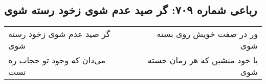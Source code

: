 \begin{center}
\section*{رباعی شماره ۷۰۹: گر صید عدم شوی زخود رسته شوی}
\label{sec:sh709}
\begin{longtable}{l p{0.5cm} r}
گر صید عدم شوی زخود رسته شوی
&&
ور در صفت خویش روی بسته شوی
\\
می‌دان که وجود تو حجاب ره تست
&&
با خود منشین که هر زمان خسته شوی
\\
\end{longtable}
\end{center}

